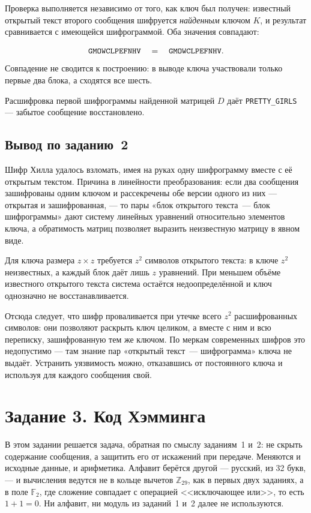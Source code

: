 \documentclass[a4paper,14pt]{extarticle}
\begin{document}
Проверка выполняется независимо от того, как ключ был получен: известный открытый
текст второго сообщения шифруется \emph{найденным} ключом $K$, и результат
сравнивается с имеющейся шифрограммой. Оба значения совпадают:

\begin{equation}
  \text{\texttt{GMOWCLPEFNHV}} \quad = \quad \text{\texttt{GMOWCLPEFNHV}} .
\end{equation}
Совпадение не сводится к построению: в выводе ключа участвовали только первые
два блока, а сходятся все шесть.

Расшифровка первой шифрограммы найденной матрицей $D$ даёт
\texttt{PRETTY\_GIRLS} --- забытое сообщение восстановлено.

\subsection*{Вывод по заданию~2}

Шифр Хилла удалось взломать, имея на руках одну шифрограмму вместе с её открытым
текстом. Причина в линейности преобразования: если два сообщения зашифрованы одним
ключом и рассекречены обе версии одного из них --- открытая и зашифрованная, ---
то пары «блок открытого текста~--- блок шифрограммы» дают систему линейных
уравнений относительно элементов ключа, а обратимость матриц позволяет выразить
неизвестную матрицу в явном виде.

Для ключа размера $z \times z$ требуется $z^2$ символов открытого текста: в ключе
$z^2$ неизвестных, а каждый блок даёт лишь $z$ уравнений. При меньшем объёме
известного открытого текста система остаётся недоопределённой и ключ однозначно
не восстанавливается.

Отсюда следует, что шифр проваливается при утечке всего $z^2$ расшифрованных
символов: они позволяют раскрыть ключ целиком, а вместе с ним и всю переписку,
зашифрованную тем же ключом. По меркам современных шифров это недопустимо ---
там знание пар «открытый текст~--- шифрограмма» ключа не выдаёт. Устранить
уязвимость можно, отказавшись от постоянного ключа и используя для каждого
сообщения свой.

\section{Задание 3. Код Хэмминга}

В этом задании решается задача, обратная по смыслу заданиям~1 и~2: не скрыть
содержание сообщения, а защитить его от искажений при передаче. Меняются и исходные
данные, и арифметика. Алфавит берётся другой --- русский, из 32 букв, --- и вычисления
ведутся не в кольце вычетов $\mathbb{Z}_{29}$, как в первых двух заданиях, а в поле
$\mathbb{F}_2$, где сложение совпадает с операцией <<исключающее или>>, то есть
$1 + 1 = 0$. Ни алфавит, ни модуль из заданий~1 и~2 далее не используются.
\end{document}
